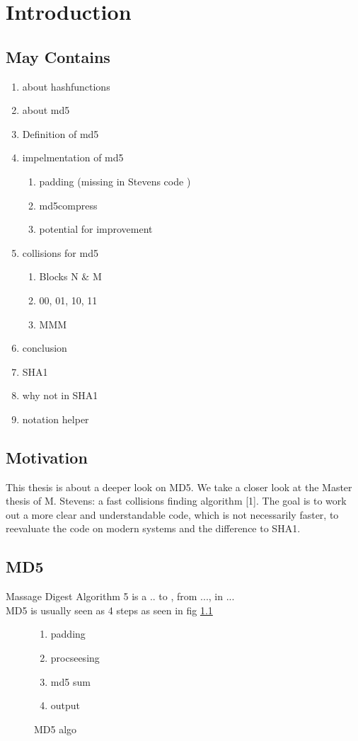 \chapter{Introduction}
\section{May Contains}
\begin{enumerate}

    \item about hashfunctions
    \item about md5
    \item Definition of md5
    \item impelmentation of md5
        \begin{enumerate}
            \item padding (missing in Stevens code )
            \item md5compress
            \item potential for improvement 
        \end{enumerate}
    \item collisions for md5
        \begin{enumerate}
            \item Blocks N $\&$ M
            \item 00, 01, 10, 11
            \item MMM
        \end{enumerate}
    \item conclusion
    \item SHA1
    \item why not in SHA1
    \item notation helper

\end{enumerate}
\section*{Motivation}
This thesis is about a deeper look on MD5.
We take a closer look at the Master thesis of M. Stevens: a fast collisions finding algorithm [1].
The goal is to work out a more clear and understandable code, which is not necessarily faster, to reevaluate the code on modern systems and the difference to SHA1. 
\section{MD5}
Massage Digest Algorithm 5 is a .. to , from ..., in ... \\
MD5 is usually seen as 4 steps as seen in fig \ref{md5}\\
\begin{figure}
    \begin{enumerate}
        \item padding
        \item procseesing
        \item md5 sum 
        \item output
    \end{enumerate}
\caption{MD5 algo}
\label{md5}
\end{figure}

